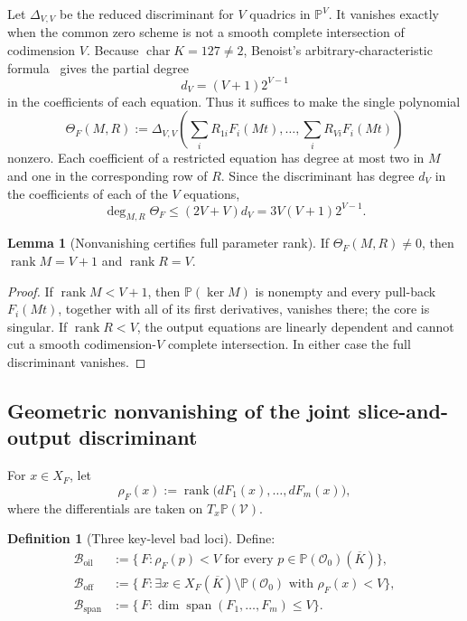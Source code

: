 \documentclass[11pt,a4paper]{article}
\theoremstyle{definition}
\newtheorem{lemma}[theorem]{Lemma}
\newtheorem{definition}[theorem]{Definition}
\theoremstyle{remark}
\newcommand{\PP}{\mathbb P}
\newcommand{\cO}{\mathcal O}
\newcommand{\cB}{\mathcal B}
\newcommand{\cV}{\mathcal V}
\newcommand{\Span}{\operatorname{span}}
\newcommand{\rank}{\operatorname{rank}}
\newcommand{\oil}{\mathrm{oil}}
\newcommand{\off}{\mathrm{off}}
\newcommand{\spanbad}{\mathrm{span}}
\begin{document}
Let $\Delta_{V,V}$ be the reduced discriminant for $V$ quadrics in $\PP^V$.  It vanishes exactly when the common zero scheme is not a smooth complete intersection of codimension $V$.  Because $\operatorname{char}K=127\ne2$, Benoist's arbitrary-characteristic formula~\cite{Benoist} gives the partial degree
\begin{equation}\label{eq:dpartial}
d_V=(V+1)2^{V-1}
\end{equation}
in the coefficients of each equation.  Thus it suffices to make the single polynomial
\begin{equation}\label{eq:theta}
\Theta_F(M,R):=
\Delta_{V,V}\!\left(\sum_iR_{1i}F_i(Mt),\ldots,
\sum_iR_{Vi}F_i(Mt)
\right)
\end{equation}
nonzero.  Each coefficient of a restricted equation has degree at most two in $M$ and one in the corresponding row of $R$.  Since the discriminant has degree $d_V$ in the coefficients of each of the $V$ equations,
\begin{equation}\label{eq:theta-degree}
\deg_{M,R}\Theta_F
\le (2V+V)d_V
=3V(V+1)2^{V-1}.
\end{equation}

\begin{lemma}[Nonvanishing certifies full parameter rank]\label{lem:theta-ranks}
If $\Theta_F(M,R)\ne0$, then $\rank M=V+1$ and $\rank R=V$.
\end{lemma}

\begin{proof}
If $\rank M<V+1$, then $\PP(\ker M)$ is nonempty and every pull-back $F_i(Mt)$, together with all of its first derivatives, vanishes there; the core is singular.  If $\rank R<V$, the output equations are linearly dependent and cannot cut a smooth codimension-$V$ complete intersection.  In either case the full discriminant vanishes.
\end{proof}

\subsection{Geometric nonvanishing of the joint slice-and-output discriminant}

For $x\in X_F$, let
\[
\rho_F(x):=\rank\bigl(dF_1(x),\ldots,dF_m(x)\bigr),
\]
where the differentials are taken on $T_x\PP(\cV)$.

\begin{definition}[Three key-level bad loci]\label{def:bad-loci}
Define:
\begin{align*}
\cB_{\oil}&:=\{\,F:\rho_F(p)<V\text{ for every }p\in\PP(\cO_0)(\overline K)\},\\
\cB_{\off}&:=\{\,F:\exists x\in X_F(\overline K)\setminus\PP(\cO_0)\text{ with }\rho_F(x)<V\},\\
\cB_{\spanbad}&:=\{\,F:\dim\Span(F_1,\ldots,F_m)\le V\}.
\end{align*}
\end{definition}
\end{document}
